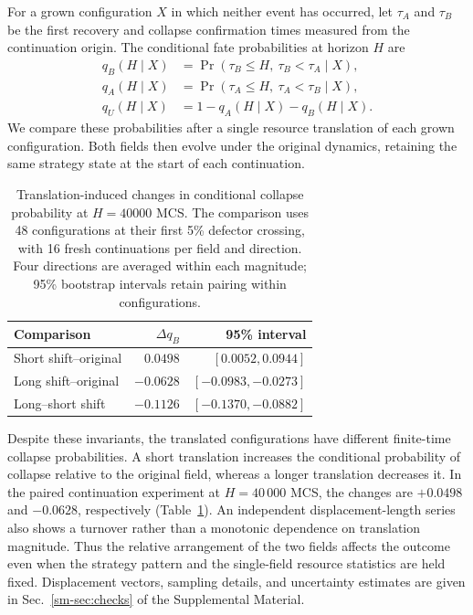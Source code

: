 For a grown configuration $X$ in which neither event has occurred, let $\tau_A$ and $\tau_B$ be the first recovery and collapse confirmation times measured from the continuation origin. The conditional fate probabilities at horizon $H$ are
\begin{equation}
\label{eq:conditional_fate}
\begin{aligned}
q_B(H\mid X)&=\Pr(\tau_B\le H,\ \tau_B<\tau_A\mid X),\\
q_A(H\mid X)&=\Pr(\tau_A\le H,\ \tau_A<\tau_B\mid X),\\
q_U(H\mid X)&=1-q_A(H\mid X)-q_B(H\mid X).
\end{aligned}
\end{equation}
We compare these probabilities after a single resource translation of each grown configuration. Both fields then evolve under the original dynamics, retaining the same strategy state at the start of each continuation.

\begin{table}[t]
\caption{Translation-induced changes in conditional collapse probability at $H=40000$ MCS. The comparison uses 48 configurations at their first 5\% defector crossing, with 16 fresh continuations per field and direction. Four directions are averaged within each magnitude; 95\% bootstrap intervals retain pairing within configurations.}
\label{tab:translation_risk}
\centering
\begin{tabular}{lrr}
\toprule
Comparison & $\Delta q_B$ & 95\% interval \\
\midrule
Short shift--original & $0.0498$ & $[0.0052,0.0944]$ \\
Long shift--original & $-0.0628$ & $[-0.0983,-0.0273]$ \\
Long--short shift & $-0.1126$ & $[-0.1370,-0.0882]$ \\
\bottomrule
\end{tabular}
\end{table}

Despite these invariants, the translated configurations have different finite-time collapse probabilities. A short translation increases the conditional probability of collapse relative to the original field, whereas a longer translation decreases it. In the paired continuation experiment at $H=40\,000$ MCS, the changes are $+0.0498$ and $-0.0628$, respectively (Table~\ref{tab:translation_risk}). An independent displacement-length series also shows a turnover rather than a monotonic dependence on translation magnitude. Thus the relative arrangement of the two fields affects the outcome even when the strategy pattern and the single-field resource statistics are held fixed. Displacement vectors, sampling details, and uncertainty estimates are given in Sec.~\ref{sm-sec:checks} of the Supplemental Material.

